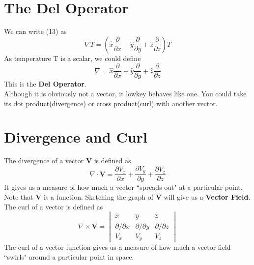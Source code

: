 \documentclass[12pt]{article}
\begin{document}
\section{The Del Operator}
We can write (13) as 
\begin{equation}
    \nabla T = \left(\hat{x}\frac{\partial}{\partial x}+\hat{y}\frac{\partial}{\partial y}+\hat{z}\frac{\partial}{\partial z}\right)T
\end{equation}
As temperature T is a scalar, we could define 
\begin{equation}
    \nabla = \hat{x}\frac{\partial}{\partial x}+\hat{y}\frac{\partial}{\partial y}+\hat{z}\frac{\partial}{\partial z}
\end{equation}
This is the \textbf{Del Operator}. \\ Although it is obviously not a vector, it lowkey behaves like one.
You could take its dot product(divergence) or cross product(curl) with another vector.

\section{Divergence and Curl}
The divergence of a vector \textbf{V} is defined as
\begin{equation}
    \nabla \cdot \mathbf{V} = \frac{\partial V_x}{\partial x}+\frac{\partial V_y}{\partial y}+\frac{\partial V_z}{\partial z}
\end{equation}
It gives us a measure of how much a vector ``spreads out" at a particular point. Note that \textbf{V} is a function. Sketching the graph of \textbf{V}
will give us a \textbf{Vector Field}. \\
The curl of a vector is defined as 
\begin{equation}
    \nabla \times \mathbf{V}=\begin{vmatrix}
                                \hat{x} & \hat{y} & \hat{z} \\
                                \partial/\partial x & \partial/\partial y & \partial/\partial z \\
                                 V_x & V_y & V_z
                              \end{vmatrix}
\end{equation}
The curl of a vector function gives us a measure of how much a vector field ``swirls" around a particular point in space.
\end{document}
